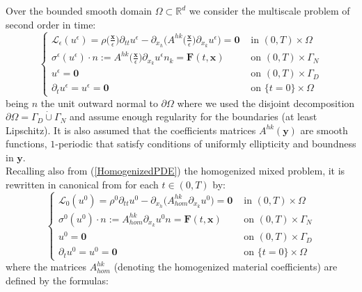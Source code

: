 Over the bounded smooth domain $\Omega \subset \mathbb{R}^d$ we consider the multiscale problem of second order in time:
\begin{equation}
    \label{MainMultiPDE}
    \left \{
    \begin{array}{cc}
        \mathcal{L}_{\epsilon}(u^{\epsilon}) = \rho\big( \frac{\mathbf{x}}{\epsilon} \big) \partial_{tt} u^{\epsilon} - \partial_{x_h} \big( A^{hk}\big( \frac{\mathbf{x}}{\epsilon} \big) \partial_{x_k} u^{\epsilon} \big)  = \mathbf{0} & \text{ in } (0,T)\times \Omega  \\
        \sigma^{\epsilon}(u^{\epsilon})\cdot n := A^{hk}\big( \frac{\mathbf{x}}{\epsilon} \big) \partial_{x_k} u^{\epsilon} n_k  = \mathbf{F}(t,\mathbf{x}) & \text{ on } (0,T) \times \Gamma_N \\
        u^{\epsilon} =  \mathbf{0} & \text{ on } (0,T) \times \Gamma_D \\
        \partial_t u^{\epsilon} = u^{\epsilon} = \mathbf{0} & \text{ on } \{ t=0 \} \times \Omega 
    \end{array}
    \right.
\end{equation}
being $n$ the unit outward normal to $\partial \Omega$ where we used the disjoint decomposition $\partial \Omega = \Gamma_D \dot \cup \Gamma_N$ and assume enough regularity for the boundaries (at least Lipschitz). It is also assumed that the coefficients matrices $A^{hk}(\mathbf{y})$ are smooth functions, $1$-periodic that satisfy conditions of uniformly ellipticity and boundness in $\mathbf{y}$.\\
Recalling also from (\ref{HomogenizedPDE}) the homogenized mixed problem, it is rewritten in canonical from for each $t \in (0,T)$ by:
\begin{equation}
    \label{HomMultiPDE}
    \left \{
    \begin{array}{ccc}
        \mathcal{L}_0 (u^0) = \rho^0 \partial_{tt} u^0 - \partial_{x_h}\big( A^{hk}_{hom} \partial_{x_k} u^0 \big) = \mathbf{0} & \text{ in } (0,T)\times \Omega \\
        \sigma^0(u^0) \cdot n := A^{hk}_{hom} \partial_{x_k}u^0 n = \mathbf{F}(t, \mathbf{x}) & \text{ on } (0,T) \times \Gamma_N \\
        u^0 = \mathbf{0} & \text{ on } (0,T) \times \Gamma_D \\
        \partial_t u^0 = u^0 = \mathbf{0} & \text{ on } \{ t=0 \} \times \Omega
    \end{array}
    \right .
\end{equation}
where the matrices $A^{hk}_{hom}$ (denoting the homogenized material coefficients) are defined by the formulas:
